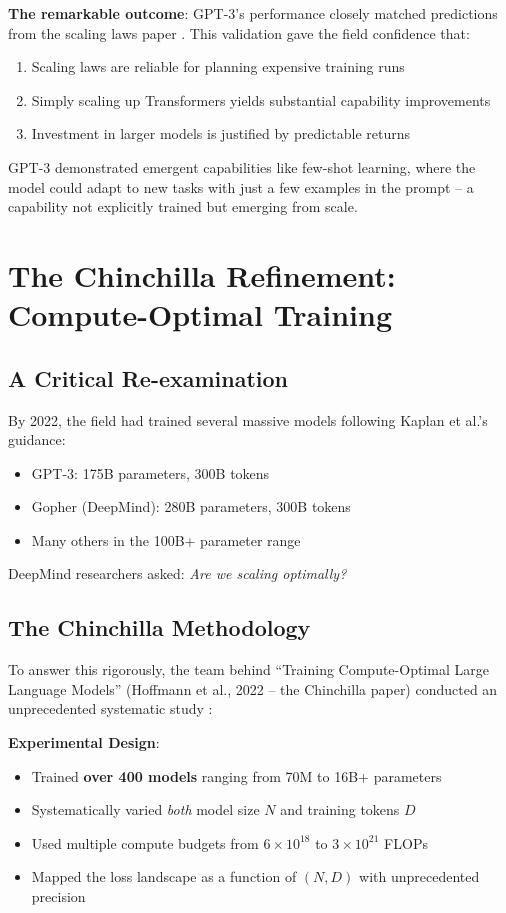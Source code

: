 \documentclass{article}
\begin{document}
\textbf{The remarkable outcome}: GPT-3's performance closely matched predictions from the scaling laws paper \cite{kaplan2020scaling}. This validation gave the field confidence that:
\begin{enumerate}
\item Scaling laws are reliable for planning expensive training runs
\item Simply scaling up Transformers yields substantial capability improvements
\item Investment in larger models is justified by predictable returns
\end{enumerate}

GPT-3 demonstrated emergent capabilities like few-shot learning, where the model could adapt to new tasks with just a few examples in the prompt -- a capability not explicitly trained but emerging from scale.

\section{The Chinchilla Refinement: Compute-Optimal Training}

\subsection{A Critical Re-examination}

By 2022, the field had trained several massive models following Kaplan et al.'s guidance:
\begin{itemize}
\item GPT-3: 175B parameters, 300B tokens
\item Gopher (DeepMind): 280B parameters, 300B tokens
\item Many others in the 100B+ parameter range
\end{itemize}

DeepMind researchers asked: \textit{Are we scaling optimally?}

\subsection{The Chinchilla Methodology}

To answer this rigorously, the team behind ``Training Compute-Optimal Large Language Models'' (Hoffmann et al., 2022 -- the Chinchilla paper) conducted an unprecedented systematic study \cite{hoffmann2022training}:

\textbf{Experimental Design}:
\begin{itemize}
\item Trained \textbf{over 400 models} ranging from 70M to 16B+ parameters
\item Systematically varied \textit{both} model size $N$ and training tokens $D$
\item Used multiple compute budgets from $6 \times 10^{18}$ to $3 \times 10^{21}$ FLOPs
\item Mapped the loss landscape as a function of $(N, D)$ with unprecedented precision
\end{itemize}
\end{document}

